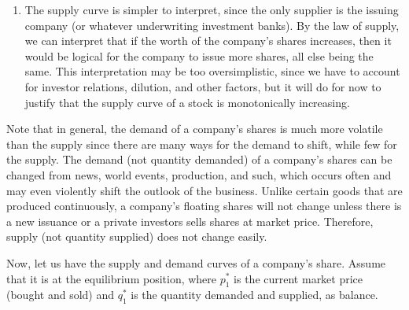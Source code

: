 \documentclass{article}
\begin{document}
\begin{enumerate}
      \item The supply curve is simpler to interpret, since the only supplier is the issuing company (or whatever underwriting investment banks). By the law of supply, we can interpret that if the worth of the company's shares increases, then it would be logical for the company to issue more shares, all else being the same. This interpretation may be too oversimplistic, since we have to account for investor relations, dilution, and other factors, but it will do for now to justify that the supply curve of a stock is monotonically increasing.  
    \end{enumerate}

    Note that in general, the demand of a company's shares is much more volatile than the supply since there are many ways for the demand to shift, while few for the supply. The demand (not quantity demanded) of a company's shares can be changed from news, world events, production, and such, which occurs often and may even violently shift the outlook of the business. Unlike certain goods that are produced continuously, a company's floating shares will not change unless there is a new issuance or a private investors sells shares at market price. Therefore, supply (not quantity supplied) does not change easily. 

    Now, let us have the supply and demand curves of a company's share. Assume that it is at the equilibrium position, where $p^\ast_1$ is the current market price (bought and sold) and $q_1^\ast$ is the quantity demanded and supplied, as balance. 
\end{document}
